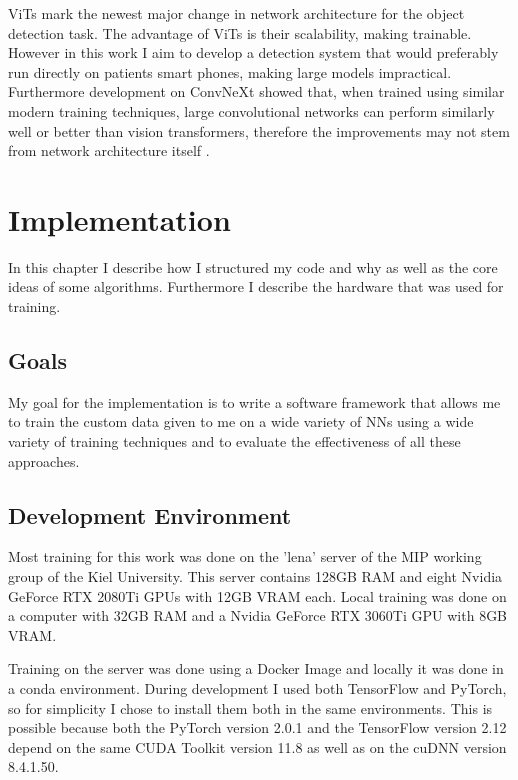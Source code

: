\documentclass[10pt]{book}
\begin{document}
\acp{ViT} mark the newest major change in network architecture for the object detection task. The advantage of \acp{ViT} is their scalability, making \cite[models of unprecedented size]{dosovitskiy2020image} trainable. However in this work I aim to develop a detection system that would preferably run directly on patients smart phones, making large models impractical. Furthermore development on ConvNeXt showed that, when trained using similar modern training techniques, large convolutional networks can perform similarly well or better than vision transformers, therefore the improvements may not stem from network architecture itself \cite{liu2022convnet}.

\chapter{Implementation}
\label{chap:implement}

In this chapter I describe how I structured my code and why as well as the core ideas of some algorithms. Furthermore I describe the hardware that was used for training.

\section{Goals}

My goal for the implementation is to write a software framework that allows me to train the custom data given to me on a wide variety of \acp{NN} using a wide variety of training techniques and to evaluate the effectiveness of all these approaches.

\section{Development Environment}

Most training for this work was done on the 'lena' server of the \ac{MIP} working group of the Kiel University. This server contains 128GB RAM and eight Nvidia GeForce RTX 2080Ti \acp{GPU} with 12GB VRAM each. Local training was done on a computer with 32GB RAM and a Nvidia GeForce RTX 3060Ti \ac{GPU} with 8GB VRAM.

Training on the server was done using a Docker Image and locally it was done in a conda environment. During development I used both TensorFlow and PyTorch, so for simplicity I chose to install them both in the same environments. This is possible because both the PyTorch version 2.0.1 and the TensorFlow version 2.12 depend on the same \ac{CUDA} Toolkit version 11.8 as well as on the \ac{cuDNN} version 8.4.1.50.
\end{document}

